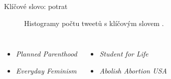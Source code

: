 \documentclass[notheorems,12pt]{beamer}
\begin{document}
\begin{frame}{Klíčové slovo: potrat}
    \vspace{-1cm}
    \begin{figure}
        \centering
        \hspace{-0.5cm}
        \vspace{-0.7cm}
        \caption*{Histogramy počtu tweetů s klíčovým slovem \textit{}.}
    \end{figure}
    \vspace{-0.3cm}
    \begin{columns}
    \column{6cm}
    	\begin{itemize}
    		\item \textit{Planned Parenthood}
    		\item \textit{Everyday Feminism}
    	\end{itemize}
    \column{6cm}
    	\begin{itemize}
    		\item \textit{Student for Life}
    		\item \textit{Abolish Abortion USA}
    	\end{itemize}
    \end{columns}
\end{frame}
\end{document}
